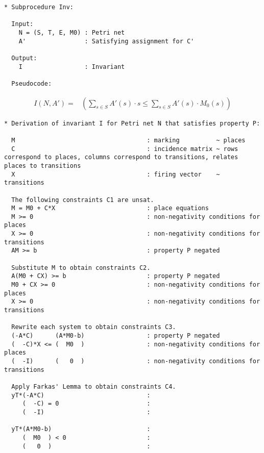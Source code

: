 \documentclass{llncs}
\begin{document}
\begin{verbatim}
* Subprocedure Inv:

  Input:
    N = (S, T, E, M0) : Petri net
    A'                : Satisfying assignment for C'

  Output:
    I                 : Invariant

  Pseudocode:
\end{verbatim}

\begin{align*}
  I(N, A') =& \left( \sum_{s \in S} A'(s) \cdot s \le
                     \sum_{s \in S} A'(s) \cdot M_0(s) \right)
\end{align*}

\newpage

\begin{verbatim}
* Derivation of invariant I for Petri net N that satisfies property P:

  M                                    : marking          ~ places
  C                                    : incidence matrix ~ rows correspond to places, columns correspond to transitions, relates places to transitions
  X                                    : firing vector    ~ transitions

  The following constraints C1 are unsat.
  M = M0 + C*X                         : place equations
  M >= 0                               : non-negativity conditions for places
  X >= 0                               : non-negativity conditions for transitions
  AM >= b                              : property P negated

  Substitute M to obtain constraints C2.
  A(M0 + CX) >= b                      : property P negated
  M0 + CX >= 0                         : non-negativity conditions for places
  X >= 0                               : non-negativity conditions for transitions

  Rewrite each system to obtain constraints C3.
  (-A*C)      (A*M0-b)                 : property P negated
  (  -C)*X <= (  M0  )                 : non-negativity conditions for places
  (  -I)      (   0  )                 : non-negativity conditions for transitions

  Apply Farkas' Lemma to obtain constraints C4.
  yT*(-A*C)                            : 
     (  -C) = 0                        : 
     (  -I)                            : 

  yT*(A*M0-b)                          : 
     (  M0  ) < 0                      : 
     (   0  )                          : 


\end{verbatim}
\end{document}
